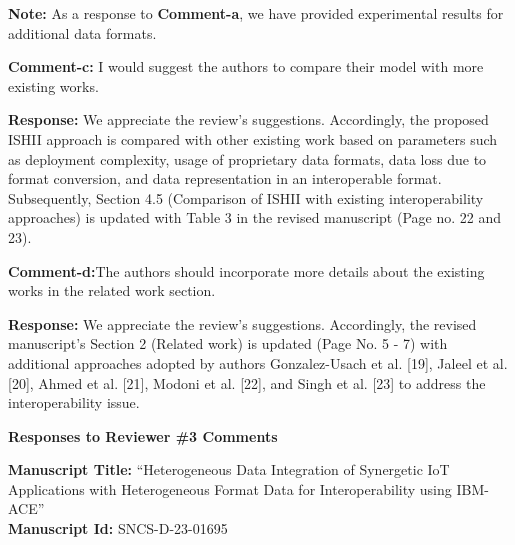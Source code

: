 \documentclass[a4paper,10pt]{article}
\begin{document}
\begin{enumerate}
\textbf{Note:} As a response to \textbf{Comment-a}, we have provided experimental results for additional data formats.

{\color{blue} \item \textbf{Comment-c:}  I would suggest the authors to compare their model with more existing works.} 

\textbf{Response:}  We appreciate the review's suggestions. Accordingly, the proposed ISHII approach is compared with other existing work based on parameters such as deployment complexity, usage of proprietary data formats, data loss due to format conversion, and data representation in an interoperable format. Subsequently, Section 4.5 (Comparison of ISHII with existing interoperability
approaches) is updated with Table 3 in the revised manuscript (Page no. 22 and 23).

{\color{blue} \item \textbf{Comment-d:}The authors should incorporate more details about the existing works in the related work section.}

\textbf{Response:}  We appreciate the review's suggestions. Accordingly, the revised manuscript's Section 2 (Related work) is updated (Page No. 5 - 7) with additional approaches adopted by authors Gonzalez-Usach et al. [19], Jaleel et al. [20], Ahmed et al. [21], Modoni et al. [22], and Singh et al. [23] to address the interoperability issue. 

\end{enumerate}


\newpage


\noindent \textbf{Responses to  Reviewer \#3 Comments}

\vspace{0.25in}

\noindent \textbf{Manuscript Title:} ``Heterogeneous Data Integration of Synergetic IoT Applications with Heterogeneous Format Data for Interoperability using IBM-ACE'' \\

\noindent \textbf{Manuscript Id:} SNCS-D-23-01695 \\
\end{document}

